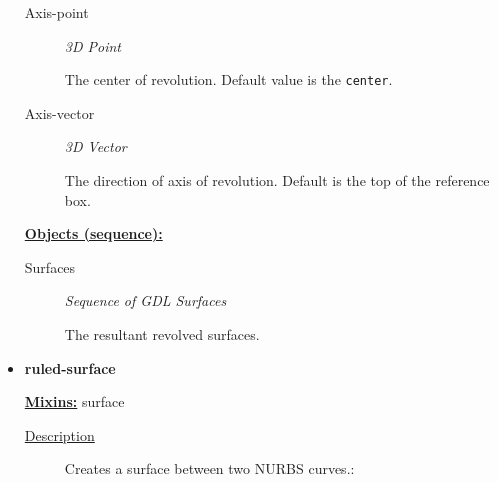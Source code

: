 \documentclass [11pt]{book}
\begin{document}
\begin{itemize}
\begin{description}
\item [Axis-point]
\emph{3D Point}

 The center of revolution. Default value is the \texttt{center}.




\item [Axis-vector]
\emph{3D Vector}

 The direction of axis of revolution. Default is the top of the reference box.




\end{description}






\textbf{
\underline{Objects (sequence):}}

\begin{description}

\item [Surfaces]
\emph{Sequence of GDL Surfaces}

 The resultant revolved surfaces.




\end{description}







\item {}
\label{prim:ruled-surface}
\textbf{ruled-surface}


\textbf{
\underline{Mixins:}} surface





\begin{description}

\item [
\underline{Description}]


Creates a surface between two NURBS curves.:



\end{description}




\begin{figure}
\begin{lrbox}{\boxedverb}
\begin{minipage}{\linewidth}
{\small

\begin{verbatim}
                  

\end{verbatim}}
\end{minipage}
\end{lrbox}
\end{figure}
\end{itemize}
\end{document}
